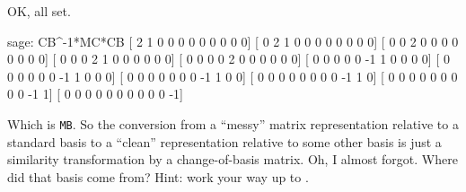 %
OK, all set.
%
\begin{sageexample}
sage: CB^-1*MC*CB
[ 2  1  0  0  0  0  0  0  0  0  0]
[ 0  2  1  0  0  0  0  0  0  0  0]
[ 0  0  2  0  0  0  0  0  0  0  0]
[ 0  0  0  2  1  0  0  0  0  0  0]
[ 0  0  0  0  2  0  0  0  0  0  0]
[ 0  0  0  0  0 -1  1  0  0  0  0]
[ 0  0  0  0  0  0 -1  1  0  0  0]
[ 0  0  0  0  0  0  0 -1  1  0  0]
[ 0  0  0  0  0  0  0  0 -1  1  0]
[ 0  0  0  0  0  0  0  0  0 -1  1]
[ 0  0  0  0  0  0  0  0  0  0 -1]
\end{sageexample}
%
Which is \verb?MB?.  So the conversion from a ``messy'' matrix representation relative to a standard basis to a ``clean'' representation relative to some other basis is just a similarity transformation by a change-of-basis matrix.  Oh, I almost forgot.  Where did that basis come from?  Hint: work your way up to .
%
\begin{sageverbatim}
\end{sageverbatim}
%
